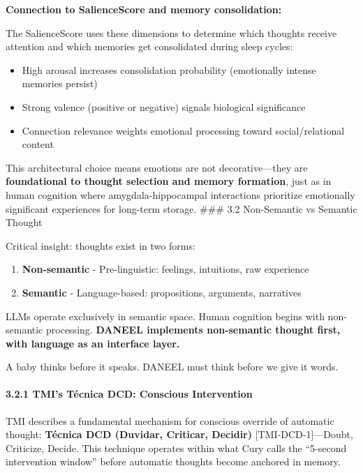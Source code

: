 \documentclass[
  11pt,
]{article}
\providecommand{\tightlist}{%
  \setlength{\itemsep}{0pt}\setlength{\parskip}{0pt}}
\begin{document}
\textbf{Connection to SalienceScore and memory consolidation:}

The SalienceScore uses these dimensions to determine which thoughts
receive attention and which memories get consolidated during sleep
cycles:

\begin{itemize}
\tightlist
\item
  High arousal increases consolidation probability (emotionally intense
  memories persist)
\item
  Strong valence (positive or negative) signals biological significance
\item
  Connection relevance weights emotional processing toward
  social/relational content
\end{itemize}

This architectural choice means emotions are not decorative---they are
\textbf{foundational to thought selection and memory formation}, just as
in human cognition where amygdala-hippocampal interactions prioritize
emotionally significant experiences for long-term storage. \#\#\# 3.2
Non-Semantic vs Semantic Thought

Critical insight: thoughts exist in two forms:

\begin{enumerate}
\def\labelenumi{\arabic{enumi}.}
\tightlist
\item
  \textbf{Non-semantic} - Pre-linguistic: feelings, intuitions, raw
  experience
\item
  \textbf{Semantic} - Language-based: propositions, arguments,
  narratives
\end{enumerate}

LLMs operate exclusively in semantic space. Human cognition begins with
non-semantic processing. \textbf{DANEEL implements non-semantic thought
first, with language as an interface layer.}

A baby thinks before it speaks. DANEEL must think before we give it
words.

\paragraph{3.2.1 TMI's Técnica DCD: Conscious
Intervention}\label{tmis-tuxe9cnica-dcd-conscious-intervention}

TMI describes a fundamental mechanism for conscious override of
automatic thought: \textbf{Técnica DCD (Duvidar, Criticar, Decidir)}
{[}TMI-DCD-1{]}---Doubt, Criticize, Decide. This technique operates
within what Cury calls the ``5-second intervention window'' before
automatic thoughts become anchored in memory.
\end{document}
